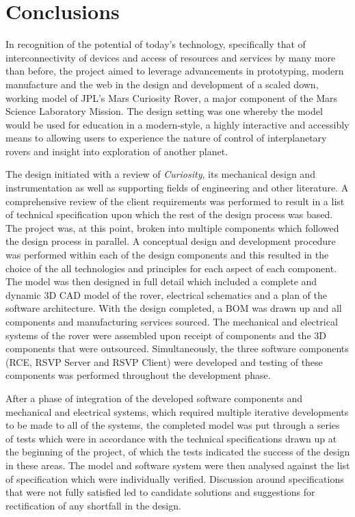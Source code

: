 \chapter{Conclusions}
  In recognition of the potential of today's technology, specifically that of interconnectivity of devices and access of resources and services by many more than before, the project aimed to leverage advancements in prototyping, modern manufacture and the web in the design and development of a scaled down, working model of JPL's Mars Curiosity Rover, a major component of the Mars Science Laboratory Mission. The design setting was one whereby the model would be used for education in a modern-style, a highly interactive and accessibly means to allowing users to experience the nature of control of interplanetary rovers and insight into exploration of another planet.
  
  The design initiated with a review of \textit{Curiosity}, its mechanical design and instrumentation as well as supporting fields of engineering and other literature. A comprehensive review of the client requirements was performed to result in a list of technical specification upon which the rest of the design process was based. The project was, at this point, broken into multiple components which followed the design process in parallel. A conceptual design and development procedure was performed within each of the design components and this resulted in the choice of the all technologies and principles for each aspect of each component. The model was then designed in full detail which included a complete and dynamic 3D CAD model of the rover, electrical schematics and a plan of the software architecture. With the design completed, a BOM was drawn up and all components and manufacturing services sourced. The mechanical and electrical systems of the rover were assembled upon receipt of components and the 3D components that were outsourced. Simultaneously, the three software components (RCE, RSVP Server and RSVP Client) were developed and testing of these components was performed throughout the development phase.
  
  After a phase of integration of the developed software components and mechanical and electrical systems, which required multiple iterative developments to be made to all of the systems, the completed model was put through a series of tests which were in accordance with the technical specifications drawn up at the beginning of the project, of which the tests indicated the success of the design in these areas. The model and software system were then analysed against the list of specification which were individually verified. Discussion around specifications that were not fully satisfied led to candidate solutions and suggestions for rectification of any shortfall in the design.
  
